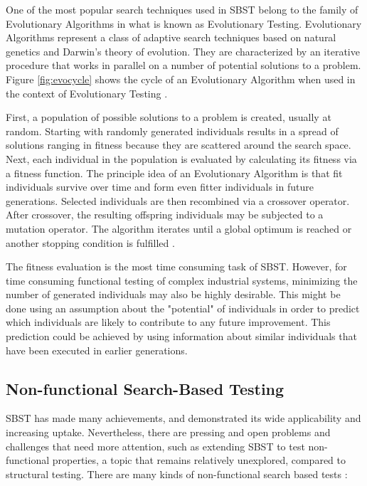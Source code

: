 \documentclass{bmcart}
\begin{document}
One of the most popular search techniques used in SBST belong to the family of Evolutionary Algorithms in what is known as Evolutionary Testing. Evolutionary Algorithms represent a class of adaptive search techniques based on natural genetics and Darwin’s theory of evolution. They are characterized by an iterative procedure that works in parallel on a number of potential solutions to a problem. Figure \ref{fig:evocycle}  shows the cycle
of an Evolutionary Algorithm when used in the context of
Evolutionary Testing \citep{Baars2011}.


First, a population of possible solutions to a problem
is created, usually at random. Starting with randomly
generated individuals results in a spread of solutions ranging in fitness because they are scattered around the search space. Next, each individual in the population is evaluated by calculating its fitness via a fitness function. The principle idea of an Evolutionary Algorithm is that fit individuals survive over time and form even fitter individuals in future
generations. Selected individuals are then recombined
via a crossover operator. After crossover, the resulting offspring individuals may be subjected to a mutation operator. The algorithm iterates until a global optimum is reached or another stopping condition is fulfilled \citep{Baars2011}. 

The fitness evaluation is the most
time consuming task of SBST. However, for time consuming functional testing of complex industrial systems, minimizing
the number of generated individuals may also be highly desirable. This might be done using an assumption about
the "potential" of individuals in order to predict which individuals are likely to contribute to any future improvement.
This prediction could be achieved by using information about similar individuals that have been executed in earlier generations.

\subsection{Non-functional Search-Based Testing}

SBST has made many achievements, and demonstrated its wide applicability and increasing uptake. Nevertheless, there are pressing and open problems and challenges that need more attention,  such as extending SBST to test non-functional properties, a topic that remains relatively unexplored, compared to structural testing. There are many kinds of non-functional search based tests  \citep{Afzal2009a}:
\end{document}
